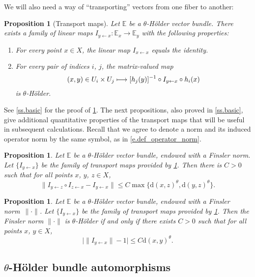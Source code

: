\documentclass[JEP,XML,SOM,Unicode]{cedram}
\newcommand\mto{\mathchoice{\longmapsto}{\mapsto}{\mapsto}{\mapsto}}
\theoremstyle{plain}
\newtheorem{proposition}[theorem]{Proposition}
\theoremstyle{definition}
\newcommand{\EE}{\mathbb{E}}
\newcommand{\dd}{\mathrm{d}}
\begin{document}
We will also need a way of ``transporting'' vectors from one fiber to another:

\begin{proposition}[Transport maps]\label{p.transport}
Let $\EE$ be a $\theta$-Hölder vector bundle.
There exists a family of linear maps $I_{y \gets x} \colon \EE_x \to \EE_y$ with the following properties:
\begin{enumerate}
\item
For every point $x \in X$, the linear map $I_{x \gets x}$ equals the identity.
\item
For every pair of indices $i$, $j$, the matrix-valued map
\[
(x,y) \in U_i \times U_j \mto [h_j(y)]^{-1} \circ I_{y \gets x} \circ h_i(x)
\]
is $\theta$-Hölder.
\end{enumerate}
\end{proposition}

See \cref{ss.basic} for the proof of \cref{p.transport}. The next propositions, also proved in \cref{ss.basic}, give additional quantitative properties of the transport maps that will be useful in subsequent calculations.
Recall that we agree to denote a norm and its induced operator norm by the same symbol, as in \eqref{e.def_operator_norm}.

\begin{proposition}\label{p.transport_groupoid}
Let $\EE$ be a $\theta$-Hölder vector bundle, endowed with a Finsler norm.
Let $\{I_{y\gets x}\}$ be the family of transport maps provided by \cref{p.transport}.
Then there is $C>0$ such that for all points $x$, $y$, $z \in X$,
\[
\| I_{y \gets z} \circ I_{z \gets x} - I_{y \gets x} \| \le C \max\{ \dd(x,z)^\theta, \dd(y,z)^\theta \}.
\]
\end{proposition}

\begin{proposition}\label{p.norm_Holder}
Let $\EE$ be a $\theta$-Hölder vector bundle, endowed with a Finsler norm~$\| \mathord{\cdot}\|$.
Let $\{I_{y\gets x}\}$ be the family of transport maps provided by \cref{p.transport}.
Then the Finsler norm $\|\mathord{\cdot}\|$ is $\theta$-Hölder if and only if
there exists $C>0$ such that for all points $x$, $y \in X$,
\[
\big| \|I_{y \gets x}\| - 1 \big| \le C \dd(x,y) ^\theta.
\]
\end{proposition}

\subsection{\texorpdfstring{$\theta$}{theta}-Hölder bundle automorphisms}\label{ss.auto}
\end{document}
